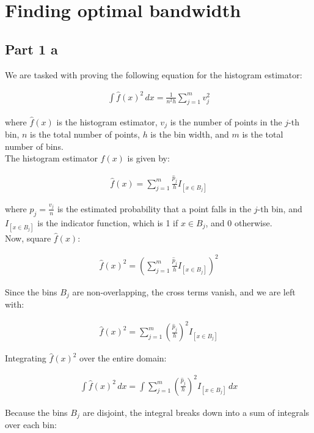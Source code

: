 \section{Finding optimal bandwidth}
\subsection{Part 1 a}
We are tasked with proving the following equation for the histogram estimator:

\begin{align}
\int \hat{f}(x)^2 \, dx = \frac{1}{n^2 h} \sum_{j=1}^{m} v_j^2
\end{align}

where \( \hat{f}(x) \) is the histogram estimator, \( v_j \) is the number of points in the \( j \)-th bin, \( n \) is the total number of points, \( h \) is the bin width, and \( m \) is the total number of bins.
\\

The histogram estimator \( \hat{f}(x) \) is given by:

\begin{align}
\hat{f}(x) = \sum_{j=1}^{m} \frac{\hat{p}_j}{h} I_{[x \in B_j]}
\end{align}

where \( \hat{p}_j = \frac{v_j}{n} \) is the estimated probability that a point falls in the \( j \)-th bin, and \( I_{[x \in B_j]} \) is the indicator function, which is 1 if \( x \in B_j \), and 0 otherwise.
\\
Now, square \( \hat{f}(x) \):

\begin{align}
\hat{f}(x)^2 = \left( \sum_{j=1}^{m} \frac{\hat{p}_j}{h} I_{[x \in B_j]} \right)^2
\end{align}

Since the bins \( B_j \) are non-overlapping, the cross terms vanish, and we are left with:

\begin{align}
\hat{f}(x)^2 = \sum_{j=1}^{m} \left( \frac{\hat{p}_j}{h} \right)^2 I_{[x \in B_j]}
\end{align}


Integrating \( \hat{f}(x)^2 \) over the entire domain:

\begin{align}
\int \hat{f}(x)^2 \, dx = \int \sum_{j=1}^{m} \left( \frac{\hat{p}_j}{h} \right)^2 I_{[x \in B_j]} \, dx
\end{align}

Because the bins \( B_j \) are disjoint, the integral breaks down into a sum of integrals over each bin:

